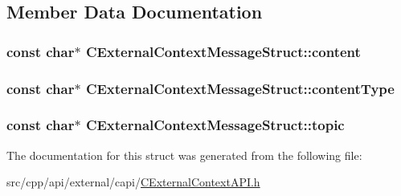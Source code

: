 \subsection{Member Data Documentation}
\hypertarget{structCExternalContextMessageStruct_adc3ded5f885401321f30476399a468a5}{
\subsubsection[{content}]{\setlength{\rightskip}{0pt plus 5cm}const char$\ast$ {\bf CExternalContextMessageStruct::content}}}
\label{structCExternalContextMessageStruct_adc3ded5f885401321f30476399a468a5}
\hypertarget{structCExternalContextMessageStruct_acfddbe81c9f691f7e426498634e61a38}{
\subsubsection[{contentType}]{\setlength{\rightskip}{0pt plus 5cm}const char$\ast$ {\bf CExternalContextMessageStruct::contentType}}}
\label{structCExternalContextMessageStruct_acfddbe81c9f691f7e426498634e61a38}
\hypertarget{structCExternalContextMessageStruct_af76a4eaa22a437238ff3e5a22f19b526}{
\subsubsection[{topic}]{\setlength{\rightskip}{0pt plus 5cm}const char$\ast$ {\bf CExternalContextMessageStruct::topic}}}
\label{structCExternalContextMessageStruct_af76a4eaa22a437238ff3e5a22f19b526}


The documentation for this struct was generated from the following file:\begin{DoxyCompactItemize}
\item 
src/cpp/api/external/capi/\hyperlink{CExternalContextAPI_8h}{CExternalContextAPI.h}\end{DoxyCompactItemize}

